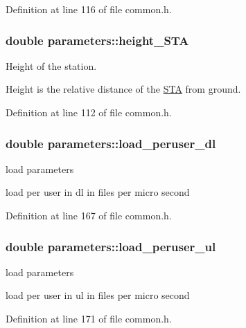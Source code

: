 Definition at line 116 of file common.\-h.

\hypertarget{structparameters_a0799b0f364ad0fe773fdec62407144f4}{
\subsubsection[{height\-\_\-\-S\-T\-A}]{\setlength{\rightskip}{0pt plus 5cm}double parameters\-::height\-\_\-\-S\-T\-A}}\label{structparameters_a0799b0f364ad0fe773fdec62407144f4}
Height of the station. \par
Height is the relative distance of the \hyperlink{classSTA}{S\-T\-A} from ground. \par


Definition at line 112 of file common.\-h.

\hypertarget{structparameters_a4785fc49f0e3c305f6a10a42fc660f01}{
\subsubsection[{load\-\_\-peruser\-\_\-dl}]{\setlength{\rightskip}{0pt plus 5cm}double parameters\-::load\-\_\-peruser\-\_\-dl}}\label{structparameters_a4785fc49f0e3c305f6a10a42fc660f01}
load parameters \par
load per user in dl in files per micro second \par


Definition at line 167 of file common.\-h.

\hypertarget{structparameters_a56a8c884f07a495d1705f0c1afb34aac}{
\subsubsection[{load\-\_\-peruser\-\_\-ul}]{\setlength{\rightskip}{0pt plus 5cm}double parameters\-::load\-\_\-peruser\-\_\-ul}}\label{structparameters_a56a8c884f07a495d1705f0c1afb34aac}
load parameters \par
load per user in ul in files per micro second 

Definition at line 171 of file common.\-h.

